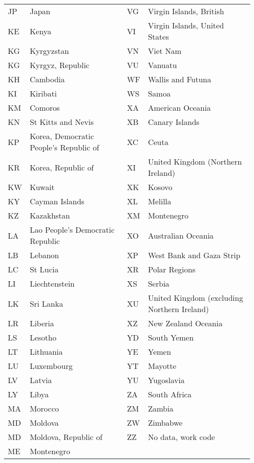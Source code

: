 {\begin{longtable}{lp{5cm}||lp{5cm}}
 JP & Japan & VG & Virgin Islands, British \\
 KE & Kenya & VI & Virgin Islands, United States \\
 KG & Kyrgyzstan & VN & Viet Nam \\
 KG & Kyrgyz, Republic & VU & Vanuatu \\
 KH & Cambodia & WF & Wallis and Futuna \\
 KI & Kiribati & WS & Samoa \\
 KM & Comoros & XA & American Oceania \\
 KN & St Kitts and Nevis & XB & Canary Islands \\
 KP & Korea, Democratic People's Republic of & XC & Ceuta \\
 KR & Korea, Republic of & XI & United Kingdom (Northern Ireland) \\
 KW & Kuwait & XK & Kosovo \\
 KY & Cayman Islands & XL & Melilla \\
 KZ & Kazakhstan & XM & Montenegro \\
 LA & Lao People's Democratic Republic & XO & Australian Oceania \\
 LB & Lebanon & XP & West Bank and Gaza Strip \\
 LC & St Lucia & XR & Polar Regions \\
 LI & Liechtenstein & XS & Serbia \\
 LK & Sri Lanka & XU & United Kingdom (excluding Northern Ireland) \\
 LR & Liberia & XZ & New Zealand Oceania \\
 LS & Lesotho & YD & South Yemen \\
 LT & Lithuania & YE & Yemen \\
 LU & Luxembourg & YT & Mayotte \\
 LV & Latvia & YU & Yugoslavia \\
 LY & Libya & ZA & South Africa \\
 MA & Morocco & ZM & Zambia \\
 MD & Moldova & ZW & Zimbabwe \\
 MD & Moldova, Republic of & ZZ & No data, work code \\
 ME & Montenegro &  &  \\
\end{longtable}
}